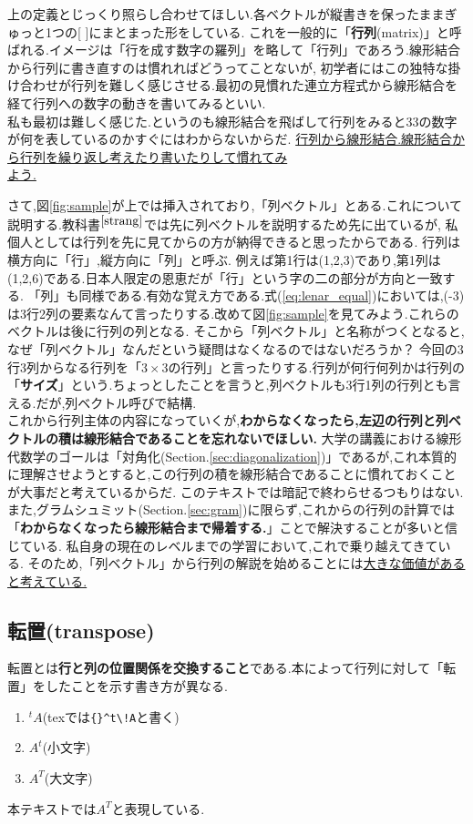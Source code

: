 上の定義とじっくり照らし合わせてほしい.各ベクトルが縦書きを保ったままぎゅっと1つの[ \quad ]にまとまった形をしている.
これを一般的に「\textbf{行列}(matrix)」と呼ばれる.イメージは「行を成す数字の羅列」を略して「行列」であろう.線形結合から行列に書き直すのは慣れればどうってことないが,
初学者にはこの独特な掛け合わせが行列を難しく感じさせる.最初の見慣れた連立方程式から線形結合を経て行列への数字の動きを書いてみるといい.\\
私も最初は難しく感じた.というのも線形結合を飛ばして行列をみると3\times 3の数字が何を表しているのかすぐにはわからないからだ.
\underline{行列から線形結合.線形結合から行列を繰り返し考えたり書いたりして慣れてみ}\\\underline{よう.}

さて,図\ref{fig:sample}が上では挿入されており,「列ベクトル」とある.これについて説明する.教科書$^{\cite{strang}}$では先に列ベクトルを説明するため先に出ているが,
私個人としては行列を先に見てからの方が納得できると思ったからである.
行列は横方向に「行」,縦方向に「列」と呼ぶ.
例えば第1行は(1,2,3)であり,第1列は(1,2,6)である.日本人限定の恩恵だが「行」という字の二の部分が方向と一致する.
「列」も同様である.有効な覚え方である.式(\ref{eq:lenar_equal})においては,(-3)は3行2列の要素なんて言ったりする.改めて図\ref{fig:sample}を見てみよう.これらのベクトルは後に行列の列となる.
そこから「列ベクトル」と名称がつくとなると,なぜ「列ベクトル」なんだという疑問はなくなるのではないだろうか？
今回の3行3列からなる行列を「$3\times3$の行列」と言ったりする.行列が何行何列かは行列の「\hypertarget{size}{\textbf{サイズ}}」という.ちょっとしたことを言うと,列ベクトルも3行1列の行列とも言える.だが,列ベクトル呼びで結構.
\\

これから行列主体の内容になっていくが,\textbf{わからなくなったら,左辺の行列と列ベクトルの積は線形結合であることを忘れないでほしい.}
大学の講義における線形代数学のゴールは「対角化(Section.\ref{sec:diagonalization})」であるが,これ本質的に理解させようとすると,この行列の積を線形結合であることに慣れておくことが大事だと考えているからだ.
このテキストでは暗記で終わらせるつもりはない.また,グラムシュミット(Section.\ref{sec:gram})に限らず,これからの行列の計算では「\textbf{わからなくなったら線形結合まで帰着する.}」ことで解決することが多いと信じている.
私自身の現在のレベルまでの学習において,これで乗り越えてきている.
そのため,「列ベクトル」から行列の解説を始めることには\underline{大きな価値があると考えている.}
\subsection{転置(transpose)}
転置とは\textbf{行と列の位置関係を交換すること}である.本によって行列に対して「転置」をしたことを示す書き方が異なる.
\begin{enumerate}
    \item ${}^t\!A$\;(texでは\verb|{}^t\!A|と書く)
    \item $A^t$(小文字)
    \item $A^T$(大文字)
\end{enumerate}
本テキストでは$A^T$と表現している.

